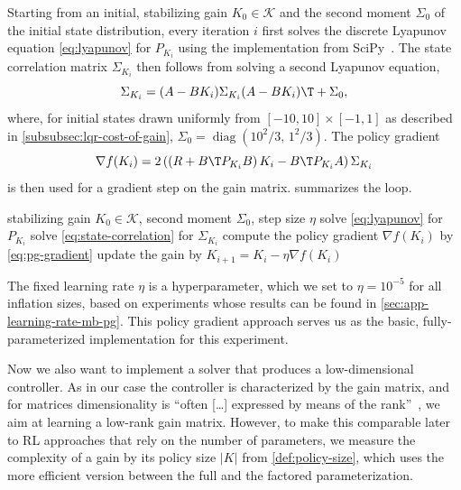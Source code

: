 Starting from an initial, stabilizing gain $K_0 \in \mathcal{K}$ and the second moment $\Sigma_0$ of the initial
state distribution, every iteration $i$ first solves the discrete Lyapunov equation \eqref{eq:lyapunov}
for $P_{K_i}$ using the implementation from SciPy~. The state correlation matrix
$\Sigma_{K_i}$ then follows from solving a second Lyapunov equation,
\begin{equation}
    \label{eq:state-correlation}
    \Sigma_{K_i} = (A - B K_i) \Sigma_{K_i} (A - B K_i)\T + \Sigma_0 ,
\end{equation}
where, for initial states drawn uniformly from $[-10, 10] \times [-1, 1]$ as described in \cref{subsubsec:lqr-cost-of-gain},
$\Sigma_0 = \operatorname{diag}\left( 10^2/3, \, 1^2/3 \right)$. The policy gradient
\begin{equation}
    \label{eq:pg-gradient}
    \nabla f(K_i) = 2 \left( \left( R + B\T P_{K_i} B \right) K_i - B\T P_{K_i} A \right) \Sigma_{K_i}
\end{equation}
is then used for a gradient step on the gain matrix.  summarizes the loop.
\begin{algorithm}[htbp]
    \caption{Model-based PG}
    \label{alg:mb-pg}
    \begin{algorithmic}[1]
        \REQUIRE stabilizing gain $K_0 \in \mathcal{K}$, second moment $\Sigma_0$, step size $\eta$
            \STATE solve \eqref{eq:lyapunov} for $P_{K_i}$
            \STATE solve \eqref{eq:state-correlation} for $\Sigma_{K_i}$
            \STATE compute the policy gradient $\nabla f(K_i)$ by \eqref{eq:pg-gradient}
            \STATE update the gain by $K_{i+1} = K_i - \eta \nabla f(K_i)$
        \ENDFOR
    \end{algorithmic}
\end{algorithm}

The fixed learning rate $\eta$ is a hyperparameter, which we set to $\eta = 10^{-5}$ for all inflation sizes, based on
experiments whose results can be found in \cref{sec:app-learning-rate-mb-pg}. This
policy gradient approach serves us as the basic, fully-parameterized implementation for this experiment.


Now we also want to implement a solver that produces a low-dimensional controller. As in our
case the controller is characterized by the gain matrix, and for matrices dimensionality is ``often
[\ldots] expressed by means of the rank''~\cite{Recht2010Guaranteed}, we aim at learning a low-rank
gain matrix. However, to make this comparable later to RL approaches that rely on the number of parameters,
we measure the complexity of a gain by its policy size $\lvert K \rvert$ from \cref{def:policy-size}, which uses
the more efficient version between the full and the factored parameterization.

